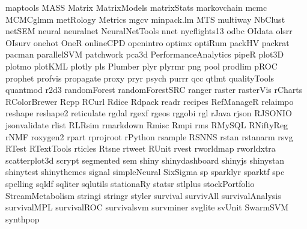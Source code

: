 \documentclass[11pt]{article} %
\begin{document}
\begin{itemize}
        maptools
        MASS 
        Matrix 
        MatrixModels 
        matrixStats 
        markovchain
        mcmc
        MCMCglmm
        metRology
        Metrics
        mgcv
        minpack.lm
        MTS
        multiway
        NbClust
        netSEM
        neural 
        neuralnet 
        NeuralNetTools
        nnet
        nycflights13
        odbc
        OIdata  
        olsrr
        OIsurv 
        onehot
        OneR
        onlineCPD
        openintro 
        optimx
        optiRum
        packHV
        packrat 
        pacman
        parallelSVM
        patchwork
        pca3d    
        PerformanceAnalytics
        pipeR 
        plot3D 
        plotmo
        plotKML
        plotly
        pls
        Plumber
        plyr
        plyrmr
        png
        pool
        prodlim
        pROC
        prophet
        profvis
        propagate
        proxy
        pryr
        psych  
        purrr
        qcc 
        qtlmt
        qualityTools   
        quantmod 
        r2d3
        randomForest
        randomForestSRC
        ranger
        raster
        rasterVis
        rCharts
        RColorBrewer 
        Rcpp 
        RCurl
        Rdice
        Rdpack
        readr
        recipes
        RefManageR
        relaimpo
        reshape 
        reshape2 
        reticulate
        rgdal
        rgexf
        rgeos 
        rggobi 
        rgl 
        rJava 
        rjson
        RJSONIO 
        jsonvalidate
        rlist 
        RLRsim
        rmarkdown 
        Rmisc
        Rmpi
        rms
        RMySQL 
        RNiftyReg   
        rNMF 
        roxygen2 
        rpart 
        rprojroot
        rPython 
        rsample
        RSNNS
        rstan
        rstanarm
        rsvg
        RTest
        RTextTools
        rticles
        Rtsne
        rtweet
        RUnit
        rvest   
        rworldmap
        rworldxtra
        scatterplot3d  
        scrypt 
        segmented 
        sem 
        shiny
        shinydashboard
        shinyjs
        shinystan
        shinytest
        shinythemes
        signal
        simpleNeural
        SixSigma  
        sp 
        sparklyr
        sparktf
        spc 
        spelling
        sqldf  
        sqliter
        sqlutils 
        stationaRy 
        statsr
        stlplus
        stockPortfolio 
        StreamMetabolism
        stringi
        stringr
        styler
        survival
        survivAll 
        survivalAnalysis 
        survivalMPL 
        survivalROC 
        survivalsvm
        survminer 
        svglite
        svUnit
        SwarmSVM
        synthpop

\end{itemize}
\end{document}
